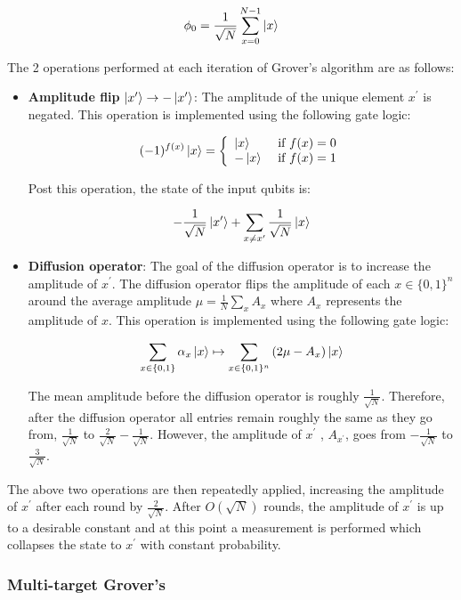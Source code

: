 $$ \phi_0 = \frac{1}{\sqrt{N}}\sum_{x=0}^{N-1} \ket{x} $$

The 2 operations performed at each iteration of Grover's algorithm are as follows:

\begin{itemize}
    \item \textbf{Amplitude flip} $\ket{x^\prime} \rightarrow -\ket{x^\prime}$: The amplitude of the unique element $x^\prime$ is negated. This operation is implemented using the following gate logic:
    
    $$ (-1)^{f(x)}\ket{x}=\left\{\begin{array}{ll}
\ket{x} & \text { if } f(x)=0 \\
-\ket{x} & \text { if } f(x)=1
\end{array}\right.  $$
    
    Post this operation, the state of the input qubits is:
    
    $$ -\frac{1}{\sqrt{N}}\ket{x^\prime} + \sum_{x \neq x^\prime} \frac{1}{\sqrt{N}}\ket{x} $$
    
    \item \textbf{Diffusion operator}: The goal of the diffusion operator is to increase the amplitude of $x^\prime$. The diffusion operator flips the amplitude of each $x \in \{0, 1\}^n$ around the average amplitude $\mu = \frac{1}{N}\sum_{x} A_x$ where $A_x$ represents the amplitude of $x$. This operation is implemented using the following gate logic:
    
    $$ \sum_{x \in\{0,1\}} \alpha_{x} \ket{x} \mapsto \sum_{x \in\{0,1\}^{n}}\left(2 \mu-A_{x}\right) \ket{x} $$
    
    The mean amplitude before the diffusion operator is roughly $\frac{1}{\sqrt{N}}$. Therefore, after the diffusion operator all entries remain roughly the same as they go from, $\frac{1}{\sqrt{N}}$ to $\frac{2}{\sqrt{N}} - \frac{1}{\sqrt{N}}$. However, the amplitude of $x^\prime$ , $A_{x^\prime}$, goes from $-\frac{1}{\sqrt{N}}$ to $\frac{3}{\sqrt{N}}$.
    
\end{itemize}

The above two operations are then repeatedly applied, increasing the amplitude of $x^\prime$ after each round by $\frac{2}{\sqrt{N}}$. After $O(\sqrt{N})$ rounds, the amplitude of $x^\prime$ is up to a desirable constant and at this point a measurement is performed which collapses the state to $x^\prime$ with constant probability.

\subsubsection{Multi-target Grover's}



